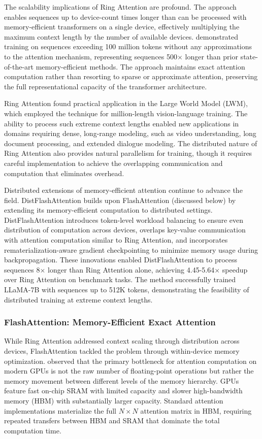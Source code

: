 The scalability implications of Ring Attention are profound. The approach enables sequences up to device-count times longer than can be processed with memory-efficient transformers on a single device, effectively multiplying the maximum context length by the number of available devices. \citet{liu2023ring} demonstrated training on sequences exceeding 100 million tokens without any approximations to the attention mechanism, representing sequences 500$\times$ longer than prior state-of-the-art memory-efficient methods. The approach maintains exact attention computation rather than resorting to sparse or approximate attention, preserving the full representational capacity of the transformer architecture.

Ring Attention found practical application in the Large World Model (LWM), which employed the technique for million-length vision-language training. The ability to process such extreme context lengths enabled new applications in domains requiring dense, long-range modeling, such as video understanding, long document processing, and extended dialogue modeling. The distributed nature of Ring Attention also provides natural parallelism for training, though it requires careful implementation to achieve the overlapping communication and computation that eliminates overhead.

Distributed extensions of memory-efficient attention continue to advance the field. DistFlashAttention builds upon FlashAttention (discussed below) by extending its memory-efficient computation to distributed settings. DistFlashAttention introduces token-level workload balancing to ensure even distribution of computation across devices, overlaps key-value communication with attention computation similar to Ring Attention, and incorporates rematerialization-aware gradient checkpointing to minimize memory usage during backpropagation. These innovations enabled DistFlashAttention to process sequences 8$\times$ longer than Ring Attention alone, achieving 4.45-5.64$\times$ speedup over Ring Attention on benchmark tasks. The method successfully trained LLaMA-7B with sequences up to 512K tokens, demonstrating the feasibility of distributed training at extreme context lengths.

\subsubsection{FlashAttention: Memory-Efficient Exact Attention}

While Ring Attention addressed context scaling through distribution across devices, FlashAttention tackled the problem through within-device memory optimization. \citet{dao2022flashattention} observed that the primary bottleneck for attention computation on modern GPUs is not the raw number of floating-point operations but rather the memory movement between different levels of the memory hierarchy. GPUs feature fast on-chip SRAM with limited capacity and slower high-bandwidth memory (HBM) with substantially larger capacity. Standard attention implementations materialize the full $N \times N$ attention matrix in HBM, requiring repeated transfers between HBM and SRAM that dominate the total computation time.

